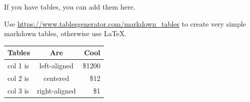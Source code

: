 \documentclass[mstat,12pt]{unswthesis}
\begin{document}
If you have tables, you can add them here.

Use \url{https://www.tablesgenerator.com/markdown_tables} to create very
simple markdown tables, otherwise use \LaTeX.

\begin{longtable}[]{@{}lcr@{}}
\toprule\noalign{}
Tables & Are & Cool \\
\midrule\noalign{}
\endhead
\bottomrule\noalign{}
\endlastfoot
col 1 is & left-aligned & \$1200 \\
col 2 is & centered & \$12 \\
col 3 is & right-aligned & \$1 \\
\end{longtable}
\end{document}
